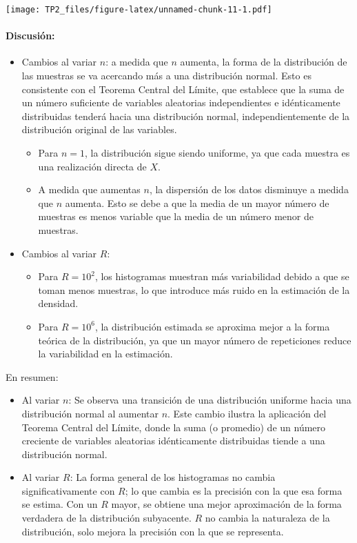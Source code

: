 \documentclass[
]{article}
\providecommand{\tightlist}{%
  \setlength{\itemsep}{0pt}\setlength{\parskip}{0pt}}
\begin{document}
\texttt{[image: TP2\_files/figure-latex/unnamed-chunk-11-1.pdf]}

\paragraph{Discusión:}\label{discusiuxf3n-3}

\begin{itemize}
\tightlist
\item
  Cambios al variar \(n\): a medida que \(n\) aumenta, la forma de la
  distribución de las muestras se va acercando más a una distribución
  normal. Esto es consistente con el Teorema Central del Límite, que
  establece que la suma de un número suficiente de variables aleatorias
  independientes e idénticamente distribuidas tenderá hacia una
  distribución normal, independientemente de la distribución original de
  las variables.

  \begin{itemize}
  \tightlist
  \item
    Para \(n = 1\), la distribución sigue siendo uniforme, ya que cada
    muestra es una realización directa de \(X\).
  \item
    A medida que aumentas \(n\), la dispersión de los datos disminuye a
    medida que \(n\) aumenta. Esto se debe a que la media de un mayor
    número de muestras es menos variable que la media de un número menor
    de muestras.
  \end{itemize}
\item
  Cambios al variar \(R\):

  \begin{itemize}
  \tightlist
  \item
    Para \(R = 10^2\), los histogramas muestran más variabilidad debido
    a que se toman menos muestras, lo que introduce más ruido en la
    estimación de la densidad.
  \item
    Para \(R = 10^6\), la distribución estimada se aproxima mejor a la
    forma teórica de la distribución, ya que un mayor número de
    repeticiones reduce la variabilidad en la estimación.
  \end{itemize}
\end{itemize}

En resumen:

\begin{itemize}
\tightlist
\item
  Al variar \(n\): Se observa una transición de una distribución
  uniforme hacia una distribución normal al aumentar \(n\). Este cambio
  ilustra la aplicación del Teorema Central del Límite, donde la suma (o
  promedio) de un número creciente de variables aleatorias idénticamente
  distribuidas tiende a una distribución normal.
\item
  Al variar \(R\): La forma general de los histogramas no cambia
  significativamente con \(R\); lo que cambia es la precisión con la que
  esa forma se estima. Con un \(R\) mayor, se obtiene una mejor
  aproximación de la forma verdadera de la distribución subyacente.
  \(R\) no cambia la naturaleza de la distribución, solo mejora la
  precisión con la que se representa.
\end{itemize}
\end{document}
